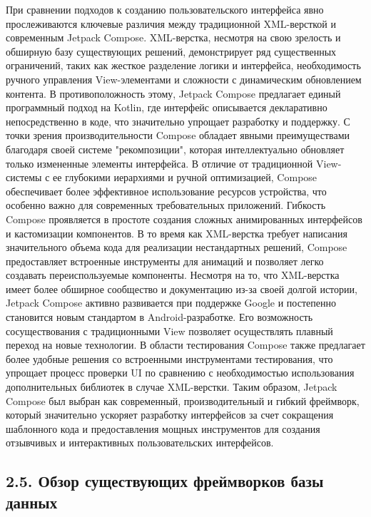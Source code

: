\documentclass{vsureport}
\begin{document}
При сравнении подходов к созданию пользовательского интерфейса явно прослеживаются ключевые различия между традиционной XML-версткой и современным Jetpack Compose. XML-верстка, несмотря на свою зрелость и обширную базу существующих решений, демонстрирует ряд существенных ограничений, таких как жесткое разделение логики и интерфейса, необходимость ручного управления View-элементами и сложности с динамическим обновлением контента. В противоположность этому, Jetpack Compose предлагает единый программный подход на Kotlin, где интерфейс описывается декларативно непосредственно в коде, что значительно упрощает разработку и поддержку.
С точки зрения производительности Compose обладает явными преимуществами благодаря своей системе "рекомпозиции", которая интеллектуально обновляет только измененные элементы интерфейса. В отличие от традиционной View-системы с ее глубокими иерархиями и ручной оптимизацией, Compose обеспечивает более эффективное использование ресурсов устройства, что особенно важно для современных требовательных приложений.
Гибкость Compose проявляется в простоте создания сложных анимированных интерфейсов и кастомизации компонентов. В то время как XML-верстка требует написания значительного объема кода для реализации нестандартных решений, Compose предоставляет встроенные инструменты для анимаций и позволяет легко создавать переиспользуемые компоненты.
Несмотря на то, что XML-верстка имеет более обширное сообщество и документацию из-за своей долгой истории, Jetpack Compose активно развивается при поддержке Google и постепенно становится новым стандартом в Android-разработке. Его возможность сосуществования с традиционными View позволяет осуществлять плавный переход на новые технологии.
В области тестирования Compose также предлагает более удобные решения со встроенными инструментами тестирования, что упрощает процесс проверки UI по сравнению с необходимостью использования дополнительных библиотек в случае XML-верстки.
Таким образом, Jetpack Compose был выбран как современный, производительный и гибкий фреймворк, который значительно ускоряет разработку интерфейсов за счет сокращения шаблонного кода и предоставления мощных инструментов для создания отзывчивых и интерактивных пользовательских интерфейсов.

\subsection*{2.5. Обзор существующих фреймворков базы данных}
\end{document}
